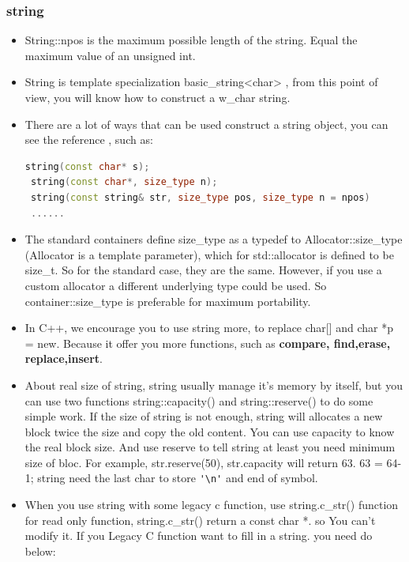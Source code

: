 \documentclass[a4paper,12pt,twoside]{book}
\begin{document}
\subsubsection{string}
\begin{itemize}
\item String::npos is the maximum possible length of the string. Equal the maximum value of an unsigned int.
\item String is template specialization basic\_string<char> , from this point of view, you will know how to construct a w\_char string.
\item There are a lot of ways that can be used construct a string object, you can see the reference , such as:
\begin{lstlisting}[frame=single, language=c++]
string(const char* s);
 string(const char*, size_type n);
 string(const string& str, size_type pos, size_type n = npos)
 ......
\end{lstlisting}

\item The standard containers define size\_type as a typedef to Allocator::size\_type (Allocator is a template parameter), which for std::allocator is defined to be size\_t. So for the standard case, they are the same. However, if you use a custom allocator a different underlying type could be used. So container::size\_type is preferable for maximum portability.

\item In C++, we encourage you to use string more, to replace char[] and char *p = new.  Because it offer you more functions, such as\textbf{ compare, find,erase, replace,insert}.

\item About real size of string, string usually manage it's memory by itself, but you can use two functions string::capacity() and string::reserve() to do some simple work. If the size of string is not enough, string will allocates a new block twice the size and copy the old content. You can use capacity to know the real block size. And use reserve to tell string at least you need minimum size of bloc. For example, str.reserve(50),  str.capacity will return 63. 63 = 64-1; string need the last char to store \verb='\n'= and end of symbol.

\item When you use string with some legacy c function, use string.c\_str() function for read only function, string.c\_str() return a const char *. so You can't modify it. If you Legacy C function want to fill in a string. you need do below:


\end{itemize}
\end{document}
